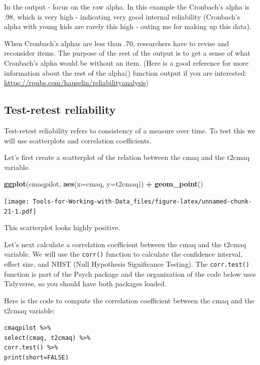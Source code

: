 \documentclass[
]{book}
\newenvironment{Shaded}{\begin{snugshade}}{\end{snugshade}}
\newcommand{\DataTypeTok}[1]{\textcolor[rgb]{0.13,0.29,0.53}{#1}}
\newcommand{\KeywordTok}[1]{\textcolor[rgb]{0.13,0.29,0.53}{\textbf{#1}}}
\newcommand{\NormalTok}[1]{#1}
\newcommand{\OperatorTok}[1]{\textcolor[rgb]{0.81,0.36,0.00}{\textbf{#1}}}
\newcommand{\StringTok}[1]{\textcolor[rgb]{0.31,0.60,0.02}{#1}}
\begin{document}
In the output - focus on the raw alpha. In this example the Cronbach's alpha is .98, which is very high - indicating very good internal reliability (Cronbach's alpha with young kids are rarely this high - outing me for making up this data).

When Cronbach's alphas are less than .70, researchers have to revise and reconsider items. The purpose of the rest of the output is to get a sense of what Cronbach's alpha would be without an item. (Here is a good reference for more information about the rest of the alpha() function output if you are interested: \url{https://rpubs.com/hauselin/reliabilityanalysis})

\hypertarget{test-retest-reliability}{%
\subsection{Test-retest reliability}\label{test-retest-reliability}}

Test-retest reliability refers to consistency of a measure over time. To test this we will use scatterplots and correlation coefficients.

Let's first create a scatterplot of the relation between the cmaq and the t2cmaq variable.

\begin{Shaded}
\begin{Highlighting}[]
\KeywordTok{ggplot}\NormalTok{(cmaqpilot, }\KeywordTok{aes}\NormalTok{(}\DataTypeTok{x=}\NormalTok{cmaq, }\DataTypeTok{y=}\NormalTok{t2cmaq)) }\OperatorTok{+}
\StringTok{  }\KeywordTok{geom_point}\NormalTok{()}
\end{Highlighting}
\end{Shaded}

\texttt{[image: Tools-for-Working-with-Data\_files/figure-latex/unnamed-chunk-21-1.pdf]}

This scatterplot looks highly positive.

Let's next calculate a correlation coefficient between the cmaq and the t2cmaq variable. We will use the \texttt{corr()} function to calculate the confidence interval, effect size, and NHST (Null Hypothesis Significance Testing). The \texttt{corr.test()} function is part of the Psych package and the organization of the code below uses Tidyverse, so you should have both packages loaded.

Here is the code to compute the correlation coefficient between the cmaq and the t2cmaq variable:

\texttt{cmaqpilot\ \%\textgreater{}\%}\\
\texttt{select(cmaq,\ t2cmaq)\ \%\textgreater{}\%}~\\
\texttt{corr.test()\ \%\textgreater{}\%}~\\
\texttt{print(short=FALSE)}
\end{document}
